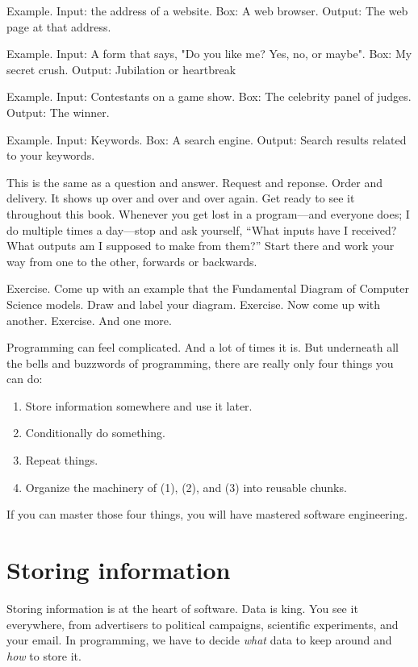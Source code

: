 Example. Input: the address of a website. Box: A web browser. Output: The web page at that address.

Example. Input: A form that says, "Do you like me? Yes, no, or maybe". Box: My secret crush. Output: Jubilation or heartbreak

Example. Input: Contestants on a game show. Box: The celebrity panel of judges. Output: The winner.

Example. Input: Keywords. Box: A search engine. Output: Search results related to your keywords.

This is the same as a question and answer. Request and reponse. Order and delivery. It shows up over and over and over again. Get ready to see it throughout this book. Whenever you get lost in a program---and everyone does; I do multiple times a day---stop and ask yourself, ``What inputs have I received? What outputs am I supposed to make from them?'' Start there and work your way from one to the other, forwards or backwards.

Exercise. Come up with an example that the Fundamental Diagram of Computer Science models. Draw and label your diagram.
Exercise. Now come up with another.
Exercise. And one more.


Programming can feel complicated. And a lot of times it is. But underneath all the bells and buzzwords of programming, there are really only four things you can do:

\begin{enumerate}
  \item Store information somewhere and use it later.
  \item Conditionally do something.
  \item Repeat things.
  \item Organize the machinery of (1), (2), and (3) into reusable chunks.
\end{enumerate}

If you can master those four things, you will have mastered software engineering.

\section{Storing information}
Storing information is at the heart of software. Data is king. You see it everywhere, from advertisers to political campaigns, scientific experiments, and your email. In programming, we have to decide \textit{what} data to keep around and \textit{how} to store it.

